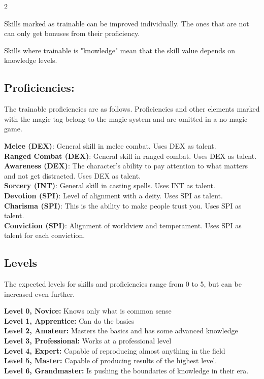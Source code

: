 \begin{multicols}{2}

Skills marked as trainable can be improved individually. The ones that are not can only get bonuses from their proficiency. 

Skills where trainable is "knowledge" mean that the skill value depends on knowledge levels.

\subsection{Proficiencies:}

The trainable proficiencies are as follows. Proficiencies and other elements marked with the magic tag belong to the magic system and are omitted in a no-magic game.

\textbf{Melee (DEX)}: General skill in melee combat. Uses DEX as talent. \\
\textbf{Ranged Combat (DEX)}: General skill in ranged combat. Uses DEX as talent. \\
\textbf{Awareness (DEX)}: The character's ability to pay attention to what matters and not get distracted. Uses DEX as talent.\\
\textbf{\magic Sorcery (INT)}: General skill in casting spells. Uses INT as talent. \\
\textbf{\magic Devotion (SPI)}: Level of alignment with a deity. Uses SPI as talent.\\
\textbf{Charisma (SPI)}: This is the ability to make people trust you. Uses SPI as talent. \\
\textbf{Conviction (SPI)}: Alignment of worldview and temperament. Uses SPI as talent for each conviction. \\

\subsection{Levels}

The expected levels for skills and proficiencies range from 0 to 5, but can be increased even further.

\textbf{Level 0, Novice:} Knows only what is common sense\\
\textbf{Level 1, Apprentice:} Can do the basics\\
\textbf{Level 2, Amateur:} Masters the basics and has some advanced knowledge\\
\textbf{Level 3, Professional:} Works at a professional level\\
\textbf{Level 4, Expert:} Capable of reproducing almost anything in the field \\
\textbf{Level 5, Master:} Capable of producing results of the highest level.\\
\textbf{Level 6, Grandmaster:} Is pushing the boundaries of knowledge in their era.\\


\end{multicols}
